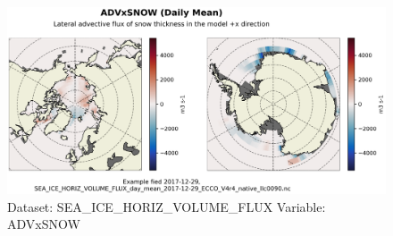 \begin{figure}[H]
\centering
\includegraphics[width=\textwidth]{../images/plots/native_plots/Sea-Ice_and_Snow_Horizontal_Volume_Fluxes/ADVxSNOW.png}
\caption{Dataset: SEA\_ICE\_HORIZ\_VOLUME\_FLUX Variable: ADVxSNOW}
\label{tab:table-SEA_ICE_HORIZ_VOLUME_FLUX_ADVxSNOW-Plot}
\end{figure}
\pagebreak
